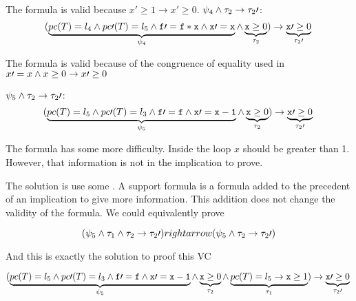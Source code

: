 	The formula is valid because $x\prime \geq 1 \to x\prime \geq 0$.
	\; $\psi_4 \wedge \tau_2 \to \tau_2\prime $:	
	\begin{equation*}
		(
			\underbrace{pc(T) = l_4 \wedge pc\prime (T) = l_5 \wedge \mathtt{f}\prime  = \mathtt{f*x} \wedge \mathtt{x\prime =x}}_{\psi_4} \wedge \underbrace{\mathtt{x} \geq 0}_{\tau_2}
		) 
			\to \underbrace{\mathtt{x}\prime  \geq 0}_{\tau_2\prime }\\\\
	\end{equation*}


	The formula is valid because of the congruence of equality used in  $x\prime =x \wedge x\geq 0 \to x\prime \geq 0$ 

	\; $\psi_5 \wedge \tau_2 \to \tau_2\prime $:	
	\begin{equation*}
		(
			\underbrace{pc(T) = l_5 \wedge pc\prime (T) = l_3 \wedge \mathtt{f\prime =f} \wedge \mathtt{x\prime =x-1}}_{\psi_5} \wedge \underbrace{\mathtt{x} \geq 0}_{\tau_2}
		) 
			\to \underbrace{\mathtt{x}\prime  \geq 0}_{\tau_2\prime }\\\\
	\end{equation*}


	The formula has some more difficulty. 
	Inside the loop $x$ should be greater than 1.
	However, that information is not in the implication to prove.
	
	The solution is use some .
	A support formula is a formula added to the precedent of an implication to give more information. 
	This addition does not change the validity of the formula.
	We could equivalently prove

	\[
		(\psi_5 \wedge \tau_1 \wedge \tau_2 \to \tau_2\prime ) rightarrow (\psi_5\wedge \tau_2\to\tau_2\prime )
	\]

	And this is exactly the solution to proof this \gls{VC}

	

	\begin{equation*}
		(
			\underbrace{pc(T) = l_5 \wedge pc\prime (T) = l_3 \wedge \mathtt{f\prime =f} \wedge \mathtt{x\prime =x-1}}_{\psi_5} \wedge \underbrace{\mathtt{x} \geq 0}_{\tau_2} \wedge \underbrace{pc(T) = l_5 \to \mathtt{x} \geq 1}_{\tau_1}
		) 
			\to \underbrace{\mathtt{x}\prime  \geq 0}_{\tau_2\prime }\\\\
	\end{equation*}


